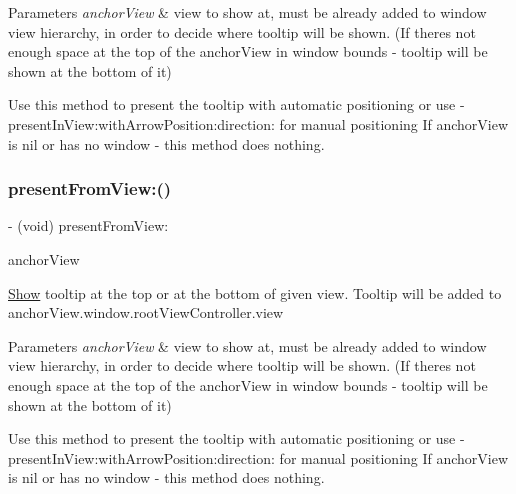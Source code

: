 \begin{DoxyParams}{Parameters}
{\em anchor\+View} & view to show at, must be already added to window view hierarchy, in order to decide where tooltip will be shown. (If there\textquotesingle{}s not enough space at the top of the anchor\+View in window bounds -\/ tooltip will be shown at the bottom of it)\\
\hline
\end{DoxyParams}
Use this method to present the tooltip with automatic positioning or use -\/present\+In\+View\+:with\+Arrow\+Position\+:direction\+: for manual positioning If anchor\+View is nil or has no window -\/ this method does nothing. \mbox{\label{interfaceFBTooltipView_a1f30bcab68dad52738ab50fd37855984}} 
\subsubsection{\texorpdfstring{present\+From\+View\+:()}{presentFromView:()}\hspace{0.1cm}{\footnotesize\ttfamily [4/5]}}
{\footnotesize\ttfamily -\/ (void) present\+From\+View\+: \begin{DoxyParamCaption}\item[{(U\+I\+View $\ast$)}]{anchor\+View }\end{DoxyParamCaption}}

\hyperlink{classShow}{Show} tooltip at the top or at the bottom of given view. Tooltip will be added to anchor\+View.\+window.\+root\+View\+Controller.\+view


\begin{DoxyParams}{Parameters}
{\em anchor\+View} & view to show at, must be already added to window view hierarchy, in order to decide where tooltip will be shown. (If there\textquotesingle{}s not enough space at the top of the anchor\+View in window bounds -\/ tooltip will be shown at the bottom of it)\\
\hline
\end{DoxyParams}
Use this method to present the tooltip with automatic positioning or use -\/present\+In\+View\+:with\+Arrow\+Position\+:direction\+: for manual positioning If anchor\+View is nil or has no window -\/ this method does nothing. \mbox{\label{interfaceFBTooltipView_a1f30bcab68dad52738ab50fd37855984}} 

